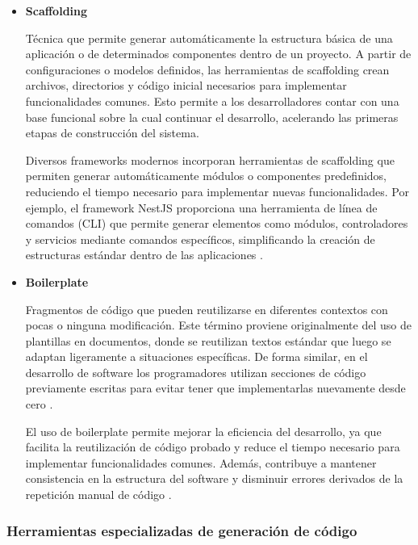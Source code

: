 \begin{itemize}

    \item \textbf{Scaffolding}  
    
    Técnica que permite generar automáticamente la estructura básica de una aplicación o de determinados componentes dentro de un proyecto. A partir de configuraciones o modelos definidos, las herramientas de scaffolding crean archivos, directorios y código inicial necesarios para implementar funcionalidades comunes. Esto permite a los desarrolladores contar con una base funcional sobre la cual continuar el desarrollo, acelerando las primeras etapas de construcción del sistema.

    Diversos frameworks modernos incorporan herramientas de scaffolding que permiten generar automáticamente módulos o componentes predefinidos, reduciendo el tiempo necesario para implementar nuevas funcionalidades. Por ejemplo, el framework NestJS proporciona una herramienta de línea de comandos (CLI) que permite generar elementos como módulos, controladores y servicios mediante comandos específicos, simplificando la creación de estructuras estándar dentro de las aplicaciones \citep{nestjs-2026}.

    \item \textbf{Boilerplate}  
    
    Fragmentos de código que pueden reutilizarse en diferentes contextos con pocas o ninguna modificación. Este término proviene originalmente del uso de plantillas en documentos, donde se reutilizan textos estándar que luego se adaptan ligeramente a situaciones específicas. De forma similar, en el desarrollo de software los programadores utilizan secciones de código previamente escritas para evitar tener que implementarlas nuevamente desde cero \citep{aws-boilerplate-2026}.

    El uso de boilerplate permite mejorar la eficiencia del desarrollo, ya que facilita la reutilización de código probado y reduce el tiempo necesario para implementar funcionalidades comunes. Además, contribuye a mantener consistencia en la estructura del software y disminuir errores derivados de la repetición manual de código \citep{aws-boilerplate-2026}.

\end{itemize}

\subsubsection*{Herramientas especializadas de generación de código}

